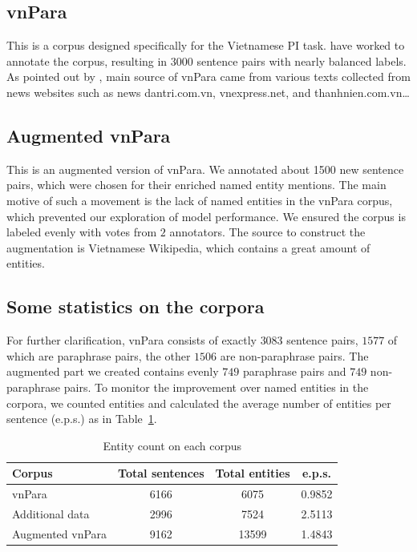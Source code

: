 \documentclass{llncs}
\begin{document}
\subsection{vnPara}

This is a corpus designed specifically for the Vietnamese PI task. \textcite{bach2015} have worked to annotate the corpus, resulting in $3000$ sentence pairs with nearly balanced labels. As pointed out by \textcite{dinh2021}, main source of vnPara came from various texts collected from news websites such as news dantri.com.vn, vnexpress.net, and thanhnien.com.vn\dots


\subsection{Augmented vnPara}

This is an augmented version of vnPara. We annotated about 1500 new sentence pairs, which were chosen for their enriched named entity mentions. The main motive of such a movement is the lack of named entities in the vnPara corpus, which prevented our exploration of model performance. We ensured the corpus is labeled evenly with votes from $2$ annotators. The source to construct the augmentation is Vietnamese Wikipedia, which contains a great amount of entities.


\subsection{Some statistics on the corpora}

For further clarification, vnPara consists of exactly $3083$ sentence pairs, $1577$ of which are paraphrase pairs, the other $1506$ are non-paraphrase pairs. The augmented part we created contains evenly $749$ paraphrase pairs and $749$ non-paraphrase pairs. To monitor the improvement over named entities in the corpora, we counted entities and calculated the average number of entities per sentence (e.p.s.) as in Table~\ref{tab:count-entities}.
\begin{table}[H]
\centering
\caption{Entity count on each corpus}
\label{tab:count-entities}
\begin{tabular}{lccc}
\toprule
\textbf{Corpus} & \textbf{Total sentences} & \textbf{Total entities} & \textbf{e.p.s.} \\ \midrule
vnPara & 6166 & 6075 & 0.9852 \\
Additional data & 2996 & 7524 & 2.5113 \\
Augmented vnPara & 9162 & 13599 & 1.4843 \\
\bottomrule
\end{tabular}
\end{table}
\end{document}

